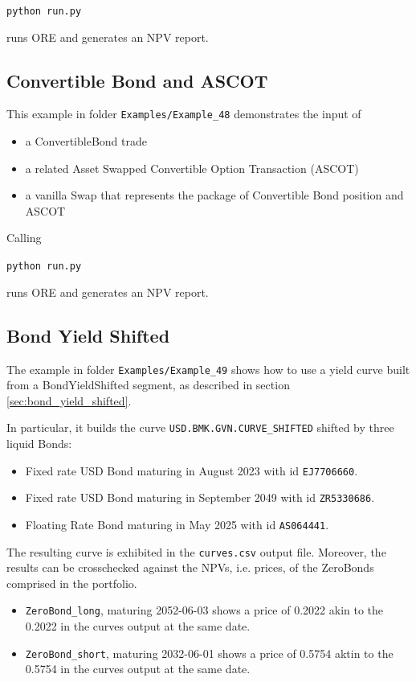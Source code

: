 \documentclass[12pt, a4paper]{article}
\begin{document}
\medskip
\centerline{\tt python run.py}

\medskip
runs ORE and generates an NPV report.

\subsection{Convertible Bond and ASCOT}%

This example in folder {\tt Examples/Example\_48} demonstrates the input of 
\begin{itemize}
\item a ConvertibleBond  trade
\item a related Asset Swapped Convertible Option Transaction (ASCOT)
\item a vanilla Swap that represents the package of Convertible Bond position and ASCOT
\end{itemize}

Calling
\medskip
\centerline{\tt python run.py}

\medskip
runs ORE and generates an NPV report.

\subsection{Bond Yield Shifted}%
\label{example:49}

The example in folder {\tt Examples/Example\_49} shows how to use a yield curve
built from a BondYieldShifted segment, as described in section \ref{sec:bond_yield_shifted}.

In particular, it builds the curve {\tt USD.BMK.GVN.CURVE\_SHIFTED} shifted by three liquid Bonds:

\begin{itemize}
\item Fixed rate USD Bond maturing in August 2023 with id {\tt EJ7706660}.
\item Fixed rate USD Bond maturing in September 2049 with id {\tt ZR5330686}.
\item Floating Rate Bond maturing in May 2025 with id {\tt AS064441}.
\end{itemize}

The resulting curve is exhibited in the {\tt curves.csv} output file.
Moreover, the results can be crosschecked against the NPVs, i.e. prices, of the ZeroBonds comprised in the portfolio.
\begin{itemize}
\item {\tt ZeroBond\_long}, maturing 2052-06-03 shows a price of 0.2022 akin to the 0.2022 in the curves output at the same date.
\item {\tt ZeroBond\_short}, maturing 2032-06-01 shows a price of 0.5754 aktin to the 0.5754 in the curves output at the same date.
\end{itemize}
\end{document}
